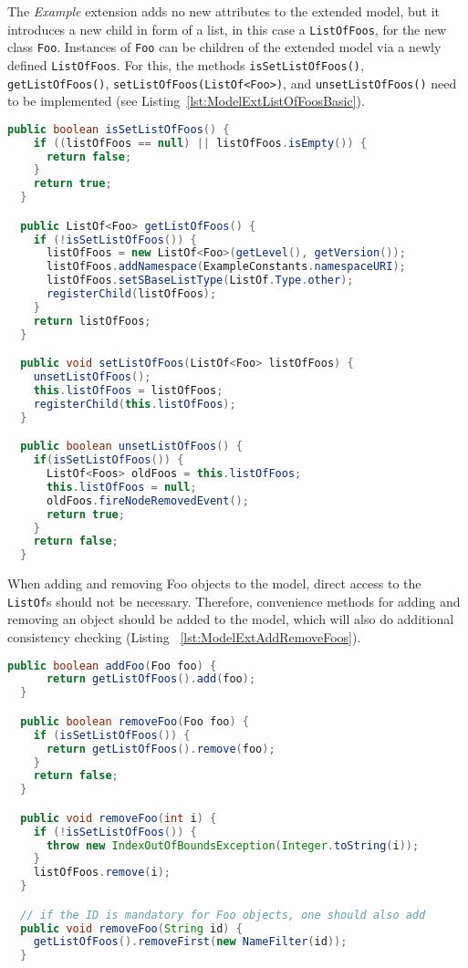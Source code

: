 The \emph{Example} extension adds no new attributes to the extended model,
but it introduces a new child in form of a list, in this case a \texttt{ListOfFoos},
for the new class \texttt{Foo}.
Instances of \texttt{Foo} can be children of the extended model via a newly
defined \texttt{ListOfFoos}. For this, the methods \texttt{isSetListOfFoos()},
\texttt{getListOfFoos()}, \texttt{setListOfFoos(ListOf<Foo>)}, and
\texttt{unsetListOfFoos()} need to be implemented (see
Listing~\vref{lst:ModelExtListOfFoosBasic}).

\begin{lstlisting}[language=Java,caption={Implementation of the \texttt{ListOf}
methods: \texttt{isSetListOfFoos()}, \texttt{getListOfFoos()},
\texttt{setListOfFoos()}},label={lst:ModelExtListOfFoosBasic}]
  public boolean isSetListOfFoos() {
    if ((listOfFoos == null) || listOfFoos.isEmpty()) {
      return false;
    }
    return true;
  }

  public ListOf<Foo> getListOfFoos() {
    if (!isSetListOfFoos()) {
      listOfFoos = new ListOf<Foo>(getLevel(), getVersion());
      listOfFoos.addNamespace(ExampleConstants.namespaceURI);
      listOfFoos.setSBaseListType(ListOf.Type.other);
      registerChild(listOfFoos);
    }
    return listOfFoos;
  }

  public void setListOfFoos(ListOf<Foo> listOfFoos) {
    unsetListOfFoos();
    this.listOfFoos = listOfFoos;
    registerChild(this.listOfFoos);
  }

  public boolean unsetListOfFoos() {
    if(isSetListOfFoos()) {
      ListOf<Foos> oldFoos = this.listOfFoos;
      this.listOfFoos = null;
      oldFoos.fireNodeRemovedEvent();
      return true;
    }
    return false;
  }
\end{lstlisting}

When adding and removing Foo objects to the model, direct access to the
\texttt{ListOf}s should not be necessary. Therefore, convenience methods for
adding and removing an object should be added to the model, which will also do
additional consistency checking (Listing ~\vref{lst:ModelExtAddRemoveFoos}).

\begin{lstlisting}[language=Java,caption={Implementation of \texttt{ListOf} methods \texttt{addFoo(Foo foo)}, \texttt{removeFoo(Foo foo)}, \texttt{removeFoo(int i)}},label={lst:ModelExtAddRemoveFoos}]
  public boolean addFoo(Foo foo) {
      return getListOfFoos().add(foo);
  }

  public boolean removeFoo(Foo foo) {
    if (isSetListOfFoos()) {
      return getListOfFoos().remove(foo);
    }
    return false;
  }

  public void removeFoo(int i) {
    if (!isSetListOfFoos()) {
      throw new IndexOutOfBoundsException(Integer.toString(i));
    }
    listOfFoos.remove(i);
  }

  // if the ID is mandatory for Foo objects, one should also add
  public void removeFoo(String id) {
    getListOfFoos().removeFirst(new NameFilter(id));
  }
\end{lstlisting}

